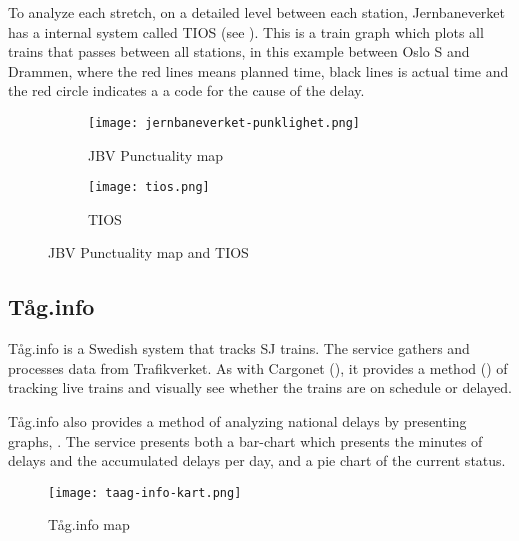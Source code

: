 To analyze each stretch, on a detailed level between each station,
Jernbaneverket has a internal system called TIOS (see ).
This is a train graph which plots all trains that passes between all stations,
in this example between Oslo S and Drammen, where the red lines means planned
time, black lines is actual time and the red circle indicates a a code for the cause of the delay. 

\begin{figure}[!htbp]
	\centering
	\begin{subfigure}{0.4\textheight}
		\texttt{[image: jernbaneverket-punklighet.png]}
		\caption[JBV Punctuality map]{JBV Punctuality map \cite{jernbaneverketPunklighetKart}}
		\label{fig:jernbaneverket-punklighet}
	\end{subfigure}
	\begin{subfigure}{0.45\textwidth}
		\texttt{[image: tios.png]}
		\caption[TIOS]{TIOS\cite{jernbaneverketPunklighetKart}}
		\label{fig:jernbaneverket-tios}
	\end{subfigure}
	\caption[JBV Punctuality map and TIOS]{JBV Punctuality map and TIOS}
	\label{fig:nbaneverket-punklighet_and_jernbaneverket-tios}
\end{figure}

\subsection{Tåg.info}
\label{sub:subsection_taag.info}

Tåg.info\cite{taagInfo} is a Swedish system that tracks SJ\cite{svenskaJernban}
trains. The service gathers and processes data from Trafikverket\cite{trafikverket}. As with Cargonet (), it 
provides a method () of tracking live trains and 
visually see whether the trains are on schedule or delayed. 

Tåg.info also provides a method of analyzing national delays by presenting
graphs, . The service presents both a bar-chart
which presents the minutes of delays and the accumulated delays per day, and a
pie chart of the current status.

\begin{figure}[!htbp]
	\texttt{[image: taag-info-kart.png]}
	\caption[Tåg.info map]{Tåg.info map
	\cite{taagInfo}}
	\label{fig:taag-info-kart}
\end{figure}

